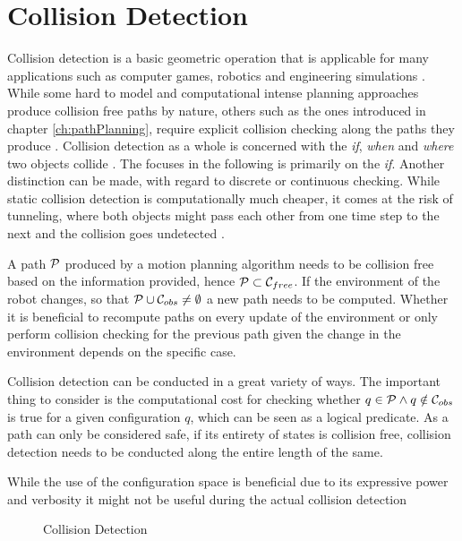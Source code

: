 \chapter{Collision Detection}
Collision detection is a basic geometric operation that is applicable for many applications such as computer games, robotics and engineering simulations \cite{Ericson.2005} \cite{Ponamgi.1997} \cite{Chazelle.1987} . While some hard to model and computational intense planning approaches produce collision free paths by nature, others such as the ones introduced in chapter \ref{ch:pathPlanning}, require explicit collision checking along the paths they produce \cite{LaValle.2006}. Collision detection as a whole is concerned with the \emph{if}, \emph{when} and \emph{where} two objects collide \cite{Ericson.2005}. The focuses in the following is primarily on the \emph{if}. Another distinction can be made, with regard to discrete or continuous checking. While static collision detection is computationally much cheaper, it comes at the risk of tunneling, where both objects might pass each other from one time step to the next and the collision goes undetected \cite{Ericson.2005}.

A path $\mathcal{P}$ produced by a motion planning algorithm needs to be collision free based on the information provided, hence $\mathcal{P} \subset \mathcal{C}_{free}$. If the environment of the robot changes, so that $\mathcal{P} \cup \mathcal{C}_{obs} \neq \emptyset$ a new path needs to be computed. Whether it is beneficial to recompute paths on every update of the environment or only perform collision checking for the previous path given the change in the environment depends on the specific case.

Collision detection can be conducted in a great variety of ways. The important thing to consider is the computational cost for checking whether $q \in \mathcal{P} \land q \notin \mathcal{C}_{obs}$ is true for a given configuration $q$, which can be seen as a logical predicate. As a path can only be considered safe, if its entirety of states is collision free, collision detection needs to be conducted along the entire length of the same.

While the use of the configuration space is beneficial due to its expressive power and verbosity it might not be useful during the actual collision detection \cite{LaValle.2006}

\begin{figure}[h]
    \caption{Collision Detection}
    \label{fig:collisionDetection}
\end{figure}

